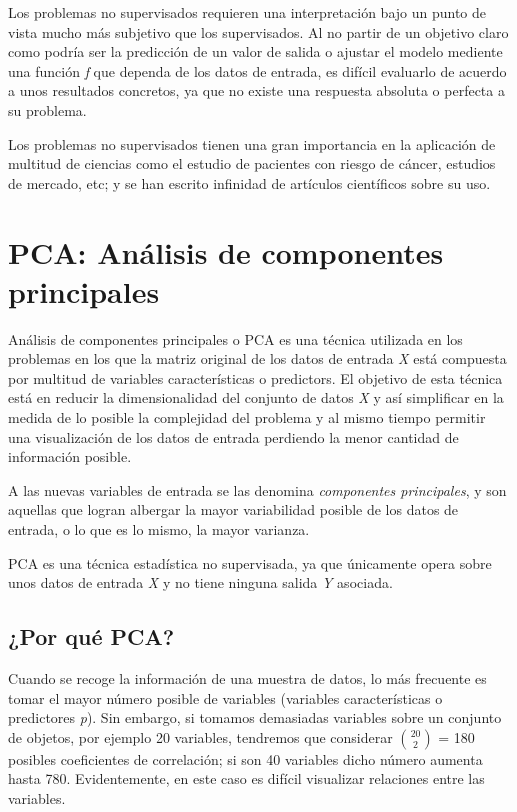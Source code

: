\documentclass[12pt,a4paper,Spanish]{book}
\begin{document}
Los problemas no supervisados requieren una interpretación bajo un punto de vista mucho más subjetivo que los supervisados. Al no partir de un objetivo claro como podría ser la predicción de un valor de salida o ajustar el modelo mediente una función \textit{f} que dependa de los datos de entrada, es difícil evaluarlo de acuerdo a unos resultados concretos, ya que no existe una respuesta absoluta o perfecta a su problema.

Los problemas no supervisados tienen una gran importancia en la aplicación de multitud de ciencias como el estudio de pacientes con riesgo de cáncer, estudios de mercado, etc; y se han escrito infinidad de artículos científicos sobre su uso.



\chapter{PCA: Análisis de componentes principales}

Análisis de componentes principales o PCA es una técnica utilizada en los problemas en los que la matriz original de los datos de entrada \textit{X} está compuesta por multitud de variables características o predictors. El objetivo de esta técnica está en reducir la dimensionalidad del conjunto de datos \textit{X} y así simplificar en la medida de lo posible la complejidad del problema y al mismo tiempo permitir una visualización de los datos de entrada perdiendo la menor cantidad de información posible.

A las nuevas variables de entrada se las denomina \textit{componentes principales}, y son aquellas que logran albergar la mayor variabilidad posible de los datos de entrada, o lo que es lo mismo, la mayor varianza.

PCA es una técnica estadística no supervisada, ya que únicamente opera sobre unos datos de entrada \textit{X} y no tiene ninguna salida \textit{Y} asociada. 


\section{¿Por qué PCA?}

Cuando se recoge la información de una muestra de datos, lo más frecuente es tomar el
mayor número posible de variables (variables características o predictores \textit{p}). Sin embargo, si tomamos demasiadas variables sobre
un conjunto de objetos, por ejemplo 20 variables, tendremos que considerar $20 \choose 2$ = 180 
posibles coeficientes de correlación; si son 40 variables dicho número aumenta hasta 780.
Evidentemente, en este caso es difícil visualizar relaciones entre las variables.
\end{document}
